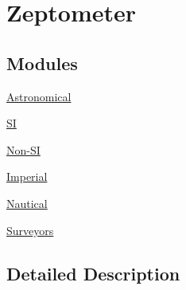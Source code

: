 \hypertarget{group___e_g_x_math-_conversions-_length_conversions-_zeptometer}{}\section{Zeptometer}
\label{group___e_g_x_math-_conversions-_length_conversions-_zeptometer}
\subsection*{Modules}
\begin{DoxyCompactItemize}
\item 
\mbox{\hyperlink{group___e_g_x_math-_conversions-_length_conversions-_zeptometer-_astronomical}{Astronomical}}
\item 
\mbox{\hyperlink{group___e_g_x_math-_conversions-_length_conversions-_zeptometer-_s_i}{SI}}
\item 
\mbox{\hyperlink{group___e_g_x_math-_conversions-_length_conversions-_zeptometer-_non-_s_i}{Non-\/\+SI}}
\item 
\mbox{\hyperlink{group___e_g_x_math-_conversions-_length_conversions-_zeptometer-_imperial}{Imperial}}
\item 
\mbox{\hyperlink{group___e_g_x_math-_conversions-_length_conversions-_zeptometer-_nautical}{Nautical}}
\item 
\mbox{\hyperlink{group___e_g_x_math-_conversions-_length_conversions-_zeptometer-_surveyors}{Surveyors}}
\end{DoxyCompactItemize}


\subsection{Detailed Description}
